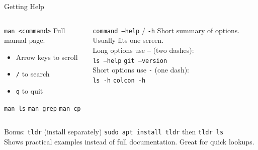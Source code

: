 \documentclass[aspectratio=169]{beamer}
\begin{document}
\begin{frame}{Getting Help}
  \begin{columns}
      \begin{block}{\texttt{man <command>}}
        Full manual page.\\[0.3em]
        \begin{itemize}
          \item Arrow keys to scroll
          \item \texttt{/} to search
          \item \texttt{q} to quit
        \end{itemize}
        \vspace{0.2em}
        \texttt{man ls} \quad \texttt{man grep} \quad \texttt{man cp}
      \end{block}
      \begin{block}{\texttt{command --help} / \texttt{-h}}
        Short summary of options.
        Usually fits one screen.\\[0.2em]
        Long options use \texttt{--} (two dashes):\\
        \texttt{ls --help} \quad \texttt{git --version}\\[0.2em]
        Short options use \texttt{-} (one dash):\\
        \texttt{ls -h} \quad \texttt{colcon -h}
      \end{block}
  \end{columns}
  \vspace{0.5em}
  \begin{exampleblock}{Bonus: \texttt{tldr} (install separately)}
    \texttt{sudo apt install tldr} \quad then \quad \texttt{tldr ls}\\
    Shows practical examples instead of full documentation.
    Great for quick lookups.
  \end{exampleblock}
\end{frame}
\end{document}
